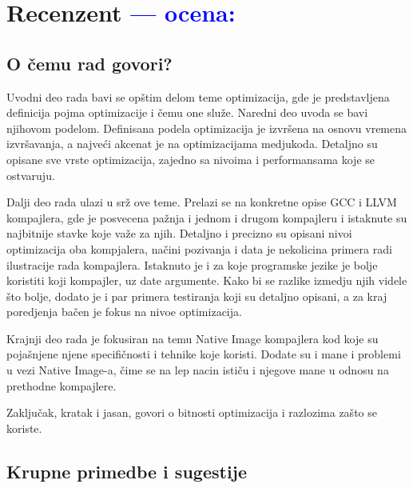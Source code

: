 \documentclass[a4paper]{report}
\newcommand{\odgovor}[1]{\textcolor{blue}{#1}}
\begin{document}
\chapter{Recenzent \odgovor{--- ocena:} }


\section{O čemu rad govori?}

Uvodni deo rada bavi se opštim delom teme optimizacija, gde je predstavljena definicija pojma optimizacije i čemu one služe. Naredni deo uvoda se bavi njihovom podelom. Definisana podela optimizacija je izvršena na osnovu vremena izvršavanja, a najveći akcenat je na optimizacijama medjukoda. Detaljno su opisane sve vrste optimizacija, zajedno sa nivoima i performansama koje se ostvaruju.

Dalji deo rada ulazi u srž ove teme. Prelazi se na konkretne opise GCC i LLVM kompajlera, gde je posvecena pažnja i jednom i drugom kompajleru i istaknute su najbitnije stavke koje važe za njih. Detaljno i precizno su opisani nivoi optimizacija oba kompjalera, načini pozivanja i data je nekolicina primera radi ilustracije rada kompajlera. Istaknuto je i za koje programske jezike je bolje koristiti koji kompajler, uz date argumente. Kako bi se razlike izmedju njih videle što bolje, dodato je i par primera testiranja koji su detaljno opisani, a za kraj poredjenja bačen je fokus na nivoe optimizacija. 

Krajnji deo rada je fokusiran na temu Native Image kompajlera kod koje su pojašnjene njene specifičnosti i tehnike koje koristi. Dodate su i mane i problemi u vezi Native Image-a, čime se na lep nacin ističu i njegove mane u odnosu na prethodne kompajlere.

Zaključak, kratak i jasan, govori o bitnosti optimizacija i razlozima zašto se koriste. 




\section{Krupne primedbe i sugestije}
\end{document}
